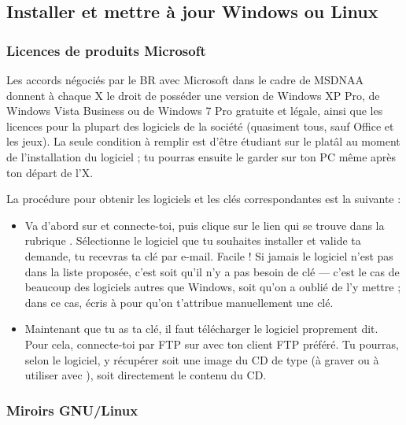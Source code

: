 \subsection{Installer et mettre à jour Windows ou Linux}

\subsubsection{Licences de produits Microsoft}
\label{msdnaa} Les accords n\'egoci\'es par le BR avec Microsoft dans le cadre de MSDNAA donnent \`a  chaque X le droit de poss\'eder une version de Windows
XP Pro, de Windows Vista Business ou de Windows 7 Pro gratuite et l\'egale, ainsi que les licences pour la plupart des logiciels de la soci\'et\'e (quasiment tous, sauf
Office et les jeux). La seule condition \`a  remplir est d'\^etre \'etudiant sur le plat\^al au moment de l'installation du logiciel ; tu pourras ensuite le
garder sur ton PC m\^eme apr\`es ton d\'epart de l'X.

La proc\'edure pour obtenir les logiciels et les cl\'es correspondantes
est la suivante :
\begin{itemize}

\item Va d'abord sur \fkz et connecte-toi, puis clique sur le lien  qui se trouve dans la rubrique . S\'electionne le logiciel que tu souhaites installer et valide ta demande, tu recevras ta cl\'e par e-mail. Facile ! Si jamais le logiciel n'est pas dans la liste propos\'ee, c'est soit qu'il n'y a pas besoin de cl\'e --- c'est le cas de beaucoup des logiciels autres que Windows, soit qu'on a oubli\'e de l'y mettre ; dans ce cas, \'ecris \`a   pour qu'on t'attribue manuellement une cl\'e.

\item Maintenant que tu as ta cl\'e, il faut t\'el\'echarger le logiciel proprement
dit. Pour cela, connecte-toi par FTP sur  avec ton client FTP pr\'ef\'er\'e. Tu pourras, selon le logiciel, y r\'ecup\'erer soit une image du CD de type  (\`a 
graver ou \`a  utiliser avec ), soit directement le contenu du CD.
 
\end{itemize}

\subsubsection{Miroirs GNU/Linux}

